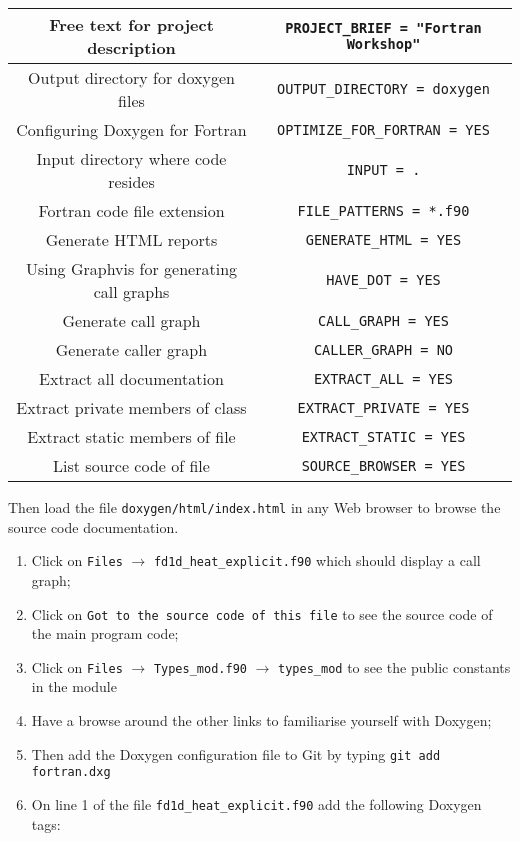 \documentclass[12pt]{article}
\begin{document}
\begin{enumerate}
\begin{center}
\begin{tabular}{| c | c |}
Free text for project description & \texttt{PROJECT\_BRIEF = "Fortran Workshop"} \\ \hline
Output directory for doxygen files & \texttt{OUTPUT\_DIRECTORY = doxygen} \\ \hline
Configuring Doxygen for Fortran & \texttt{OPTIMIZE\_FOR\_FORTRAN = YES} \\ \hline
Input directory where code resides & \texttt{INPUT = .} \\ \hline
Fortran code file extension & \texttt{FILE\_PATTERNS = *.f90} \\ \hline
Generate HTML reports & \texttt{GENERATE\_HTML = YES} \\ \hline
Using Graphvis for generating call graphs & \texttt{HAVE\_DOT = YES} \\ \hline
Generate call graph & \texttt{CALL\_GRAPH = YES} \\ \hline
Generate caller graph & \texttt{CALLER\_GRAPH = NO} \\ \hline
Extract all documentation & \texttt{EXTRACT\_ALL = YES} \\ \hline
Extract private members of class & \texttt{EXTRACT\_PRIVATE = YES} \\ \hline
Extract static members of file & \texttt{EXTRACT\_STATIC = YES} \\ \hline
List source code of file & \texttt{SOURCE\_BROWSER = YES} \\ \hline
\end{tabular}
\end{center}
Then load the file \texttt{doxygen/html/index.html} in any Web browser to browse the source code documentation.
\begin{enumerate}
\item Click on \texttt{Files} $\rightarrow$ \texttt{fd1d\_heat\_explicit.f90} which should display a call graph;
\item Click on \texttt{Got to the source code of this file} to see the source code of the main program code;
\item Click on \texttt{Files} $\rightarrow$ \texttt{Types\_mod.f90} $\rightarrow$ \texttt{types\_mod} to see
the public constants in the module
\item Have a browse around the other links to familiarise yourself with Doxygen;
\item Then add the Doxygen configuration file to Git by typing \texttt{git add fortran.dxg}
\item On line 1 of the file \texttt{fd1d\_heat\_explicit.f90} add the following Doxygen tags:

\end{enumerate}
\end{enumerate}
\end{document}
